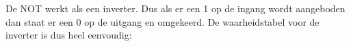De NOT werkt als een inverter. Dus als er een 1 op de ingang wordt aangeboden dan staat er een 0 op de uitgang en omgekeerd. De waarheidstabel voor de inverter is dus heel eenvoudig:


